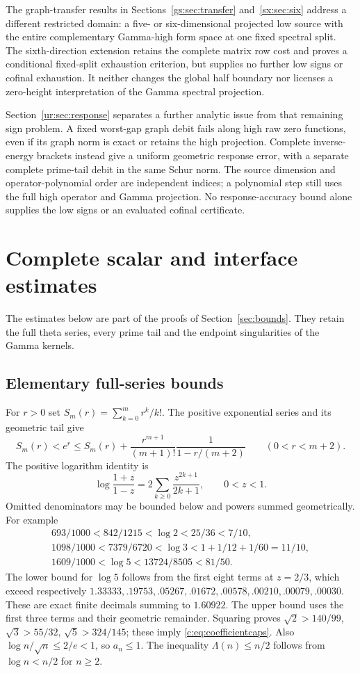 \documentclass[11pt,a4paper]{article}
\numberwithin{equation}{section}
\theoremstyle{definition}\newtheorem{definition}[theorem]{Definition}
\theoremstyle{remark}\newtheorem{remark}[theorem]{Remark}
\begin{document}
The graph-transfer results in Sections~\ref{gs:sec:transfer}
and~\ref{sx:sec:six} address a different restricted domain: a five- or
six-dimensional projected low source with the entire complementary
Gamma-high form space at one fixed spectral split. The sixth-direction
extension retains the complete matrix row cost and proves a conditional
fixed-split exhaustion criterion, but supplies no further low signs or
cofinal exhaustion. It neither changes the global half boundary nor
licenses a zero-height interpretation of the Gamma spectral projection.


Section~\ref{ur:sec:response} separates a further analytic issue from
that remaining sign problem. A fixed worst-gap graph debit fails along
high raw zero functions, even if its graph norm is exact or retains the
high projection. Complete inverse-energy brackets instead give a uniform
geometric response error, with a separate complete prime-tail debit in
the same Schur norm. The source dimension and operator-polynomial order
are independent indices; a polynomial step still uses the full high
operator and Gamma projection. No response-accuracy bound alone supplies
the low signs or an evaluated cofinal certificate.

\appendix
\section{Complete scalar and interface estimates}\label{app:costs}
The estimates below are part of the proofs of Section~\ref{sec:bounds}. They retain the full theta series, every prime tail and the endpoint singularities of the Gamma kernels.


\subsection{Elementary full-series bounds}\label{c:app:scalar}
For $r>0$ set $S_m(r)=\sum_{k=0}^m r^k/k!$.
The positive exponential series and its geometric tail give
\[
 S_m(r)<e^r\le S_m(r)+\frac{r^{m+1}}{(m+1)!}
                  \frac1{1-r/(m+2)}\qquad(0<r<m+2).
\]
The positive logarithm identity is
\begin{equation}\label{c:eq:atanh}
 \log\frac{1+z}{1-z}=2\sum_{k\ge0}\frac{z^{2k+1}}{2k+1},
 \qquad0<z<1.
\end{equation}
Omitted denominators may be bounded below and powers summed geometrically.
For example
\begin{gather*}
 693/1000<842/1215<\log2<25/36<7/10,\\
 1098/1000<7379/6720<\log3<1+1/12+1/60=11/10,\\
 1609/1000<\log5<13724/8505<81/50.
\end{gather*}
The lower bound for $\log5$ follows from the first eight terms at $z=2/3$,
which exceed respectively
$1.33333,.19753,.05267,.01672,.00578,.00210,.00079,.00030$.
These are exact finite decimals summing to $1.60922$.
The upper bound uses the first three terms and their geometric remainder.
Squaring proves
$\sqrt2>140/99$, $\sqrt3>55/32$, $\sqrt5>324/145$;
these imply \eqref{c:eq:coefficientcaps}.
Also $\log n/\sqrt n\le2/e<1$, so $a_n\le1$.
The inequality $\Lambda(n)\le n/2$ follows from $\log n<n/2$ for $n\ge2$.
\end{document}
